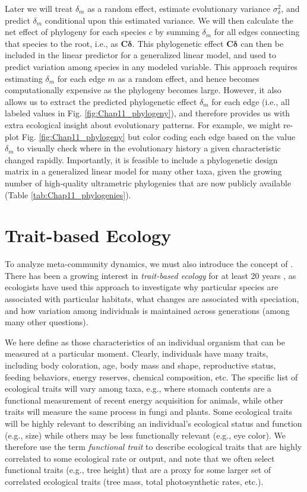 Later we will treat \(\delta_m\) as a random effect, estimate evolutionary variance \(\sigma_{\delta}^2\), and predict \(\delta_m\) conditional upon this estimated variance.  We will then calculate the net effect of phylogeny for each species \(c\) by summing \(\delta_m\) for all edges connecting that species to the root, i.e., as \(\mathbf{C \delta}\).  This phylogenetic effect \(\mathbf{C \delta}\) can then be included in the linear predictor for a generalized linear model, and used to predict variation among species in any modeled variable.  This approach requires estimating \(\delta_m\) for each edge \(m\) as a random effect, and hence becomes computationally expensive as the phylogeny becomes large.  However, it also allows us to extract the predicted phylogenetic effect \(\delta_m\) for each edge (i.e., all labeled values in Fig. \ref{fig:Chap11_phylogeny}), and therefore provides us with extra ecological insight about evolutionary patterns.  For example, we might re-plot Fig. \ref{fig:Chap11_phylogeny} but color coding each edge based on the value \(\delta_m\) to visually check where in the evolutionary history a given characteristic changed rapidly.  Importantly, it is feasible to include a phylogenetic design matrix in a generalized linear model for many other taxa, given the growing number of high-quality ultrametric phylogenies that are now publicly available (Table \ref{tab:Chap11_phylogenies}).

\section{Trait-based Ecology} \label{sec:Chap11_traits}

To analyze meta-community dynamics, we must also introduce the concept of .  There has been a growing interest in \textit{trait-based ecology} for at least 20 years \cite{mcgill_rebuilding_2006}, as ecologists have used this approach to investigate why particular species are associated with particular habitats, what changes are associated with speciation, and how variation among individuals is maintained across generations (among many other questions).  

We here define  as those characteristics of an individual organism that can be measured at a particular moment.  Clearly, individuals have many traits, including body coloration, age, body mass and shape, reproductive status, feeding behaviors, energy reserves, chemical composition, etc.  The specific list of ecological traits will vary among taxa, e.g., where stomach contents are a functional measurement of recent energy acquisition for animals, while other traits will measure the same process in fungi and plants.  Some ecological traits will be highly relevant to describing an individual's ecological status and function (e.g., size) while others may be less functionally relevant (e.g., eye color).  We therefore use the term \textit{functional trait} to describe ecological traits that are highly correlated to some ecological rate or output, and note that we often select functional traits (e.g., tree height) that are a proxy for some larger set of correlated ecological traits (tree mass, total photosynthetic rates, etc.).

